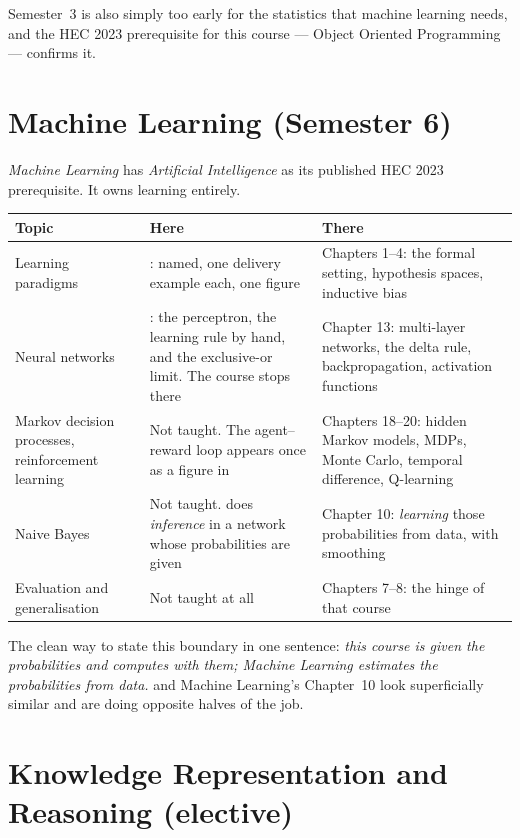Semester~3 is also simply too early for the statistics that machine learning
needs, and the HEC 2023 prerequisite for this course --- Object Oriented
Programming --- confirms it.

\section{Machine Learning (Semester 6)}

\emph{Machine Learning} has \emph{Artificial Intelligence} as its published HEC
2023 prerequisite. It owns learning entirely.

\begin{longtable}{@{}L{4.6cm}L{4.6cm}L{5.4cm}@{}}
\toprule
{}
\textbf{Topic} & \textbf{Here} & \textbf{There} \\
\midrule
\endhead
Learning paradigms & : named, one delivery example each, one
figure & Chapters 1--4: the formal setting, hypothesis spaces, inductive bias \\
Neural networks & : the perceptron, the learning rule by hand,
and the exclusive-or limit. The course stops there & Chapter 13: multi-layer
networks, the delta rule, backpropagation, activation functions \\
Markov decision processes, reinforcement learning & Not taught. The
agent--reward loop appears once as a figure in  & Chapters 18--20:
hidden Markov models, MDPs, Monte Carlo, temporal difference, Q-learning \\
Naive Bayes & Not taught.  does \emph{inference} in a network
whose probabilities are given & Chapter 10: \emph{learning} those probabilities
from data, with smoothing \\
Evaluation and generalisation & Not taught at all & Chapters 7--8: the hinge of
that course \\
\bottomrule
\end{longtable}

\begin{conceptbox}
The clean way to state this boundary in one sentence: \emph{this course is given
the probabilities and computes with them; Machine Learning estimates the
probabilities from data.}  and Machine Learning's Chapter~10 look
superficially similar and are doing opposite halves of the job.
\end{conceptbox}

\section{Knowledge Representation and Reasoning (elective)}

